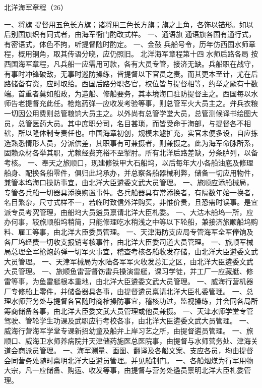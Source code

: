 \documentclass[12pt,UTF8]{ctexbook}
\begin{document}
北洋海军章程（26）

一、将旗
提督用五色长方旗；诸将用三色长方旗；旗之上角，各饰以锚形。如以后别国旗织有同式者，由海军衙门酌改式样。
一、通语旗
通语旗各国有通行式，有密语式，体色不拘，听提督随时酌定。
一、金鼓
兵船号令，历年仿西国水师章程，概用铜角，取其传语分晓，应仍照旧。
北洋海军章程第十四
水师后路各局
按西国海军章程，凡兵船一应需用可款，各有大员专管，接济无缺。兵船职在战守，有事时冲锋破敌，无事时巡防操练，皆提督以下官员之责。而其更本至计，尤在后路储备有资，应时取给。西国后路分职各官，权位皆与提督相等，约举之厥有十数端。首重者莫如船政，为造船、修船要务，其本境海口驻防提督主之。西国每以水师告老提督充此任。枪炮药弹一应收发考验等事，则总管军火大员主之。弁兵衣粮一切因公用费则总管粮饷大员主之。以外尚有总管学堂大员，总管测候译书绘图大员，总管医药大员。其中庶职分司，名目甚琐，而皆受命于海部，与提督各不相辖，所以隆体制专责任也。中国海章初创，规模未遽扩充，实官未便多设，自应拣选熟悉情形人员，分派供差，其职事有可兼摄者，则兼摄之。此为海军命脉所系，固赖众材各举其职，尤赖经费充裕不至掣肘。所有北洋后路差缺，分条胪列，以备考核。
一、奉天之旅顺口，现建修铁甲大石船坞，以后每年大小各船油底及修理船身、配换各船零件，俱归此坞承办，并总察各船器械利弊，储备一切应用物件，兼管本坞海口操防事宜，由北洋大臣遴委文武大员管理。
一、旅顺应添船械局，专管各兵船一切器具添换购置事件。各兵船器具有常添换者，有隔数年始一换者，名目繁杂，尺寸式样不一，若临时致信外洋购买，非惟价贵，且恐需时误事。是宜派专员考究管理，由船坞大员遴员禀请北洋大臣札委。
一、大沽木船坞一所，应办何事，较旅顺船坞稍简，只能修理吃水稍浅之中等以下轮船，兼接济旅顺船坞购料、雇工等事，由北洋大臣委员管理。
一、天津海防支应局专管海军全军俸饷及各厂坞经费一切收支报销考核事件，由北洋大臣委司道大员管理。
一、旅顺军械局总理全军枪炮药弹一切军火事宜，稽查考核各船收发存储，由北洋大臣遴委文武大员管理。
一、天津军械局为水陆各军军火收发总汇之区，由北洋大臣遴委文武大员管理。
一、旅顺鱼雷营督饬雷兵操演雷艇，课习学徒，并工厂一应藏艇、修雷等事，为鱼雷艇根本重地，由北洋大臣遴委文武大员管理。
一、威海行营机器厂专修船上零件，并储备器具各事，由提督遴员禀请北洋大臣札委管理。
一、总理水师营务处与提督各官随时商榷操防事宜，稽核功过，监视操练，并会同各局所筹商储备各事，由北洋大臣委文武大员管理或他员兼摄。
一、天津水师学堂专管驾驶、管轮学生功课及武职应行考校各事，由北洋大臣遴委文武大员管理。
一、威海行营海军学堂专课新招幼童及船弁上岸习艺之所，由提督遴员管理。
一、旅顺口、威海卫水师养病院并天津储药施医总医院事，由提督与水师营务处、津海关道会商派员管理。
一、海军测量、画图、翻译及各船文案、支应各员，均由提督会同营务处随时禀明北洋大臣遴员管理。并见船制门。
一、各船烟煤为行军用物大宗，凡一应储备、购运、收发等事，由提督与营务处遴员禀明北洋大臣札委管理。
\end{document}
